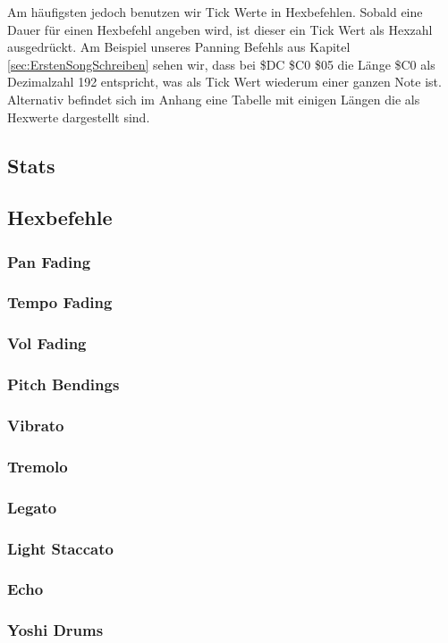 \bigskip

Am häufigsten jedoch benutzen wir Tick Werte in Hexbefehlen. Sobald eine Dauer für einen Hexbefehl angeben wird, ist dieser ein Tick Wert als Hexzahl ausgedrückt. Am Beispiel unseres Panning Befehls aus Kapitel \ref{sec:ErstenSongSchreiben} sehen wir, dass bei \$DC \$C0 \$05 die Länge \$C0 als Dezimalzahl 192 entspricht, was als Tick Wert wiederum einer ganzen Note ist. \\
Alternativ befindet sich im Anhang eine Tabelle mit einigen Längen die als Hexwerte dargestellt sind.

\subsection{Stats}
\subsection{Hexbefehle}
\subsubsection{Pan Fading}
\subsubsection{Tempo Fading}
\subsubsection{Vol Fading}
\subsubsection{Pitch Bendings}
\subsubsection{Vibrato}
\subsubsection{Tremolo}
\subsubsection{Legato}
\subsubsection{Light Staccato}
\subsubsection{Echo}
\subsubsection{Yoshi Drums}